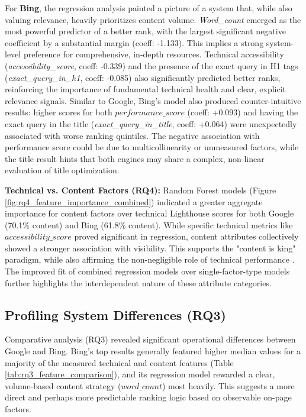 \documentclass[a4paper,fleqn]{cas-sc}
\newcommand{\longvar}[1]{\textit{#1}}
\begin{document}
For \textbf{Bing}, the regression analysis painted a picture of a system that, while also valuing relevance, heavily prioritizes content volume. \longvar{Word_count} emerged as the most powerful predictor of a better rank, with the largest significant negative coefficient by a substantial margin (coeff: -1.133). This implies a strong system-level preference for comprehensive, in-depth resources. Technical accessibility (\longvar{accessibility_score}, coeff: -0.339) and the presence of the exact query in H1 tags (\longvar{exact_query_in_h1}, coeff: -0.085) also significantly predicted better ranks, reinforcing the importance of fundamental technical health and clear, explicit relevance signals. Similar to Google, Bing's model also produced counter-intuitive results: higher scores for both $performance\_score$ (coeff: +0.093) and having the exact query in the title (\longvar{exact_query_in_title}, coeff: +0.064) were unexpectedly associated with worse ranking quintiles. The negative association with performance score could be due to multicollinearity or unmeasured factors, while the title result hints that both engines may share a complex, non-linear evaluation of title optimization.

\textbf{Technical vs. Content Factors (RQ4):} Random Forest models (Figure \ref{fig:rq4_feature_importance_combined}) indicated a greater aggregate importance for content factors over technical Lighthouse scores for both Google (70.1\% content) and Bing (61.8\% content). While specific technical metrics like $accessibility\_score$ proved significant in regression, content attributes collectively showed a stronger association with visibility. This supports the "content is king" paradigm, while also affirming the non-negligible role of technical performance \citep{Roumeliotis2022}. The improved fit of combined regression models over single-factor-type models further highlights the interdependent nature of these attribute categories.

\subsection{Profiling System Differences (RQ3)}
\label{subsec:discussion_rq3}
Comparative analysis (RQ3) revealed significant operational differences between Google and Bing. Bing's top results generally featured higher median values for a majority of the measured technical and content features (Table \ref{tab:rq3_feature_comparison}), and its regression model rewarded a clear, volume-based content strategy ($word\_count$) most heavily. This suggests a more direct and perhaps more predictable ranking logic based on observable on-page factors.
\end{document}
